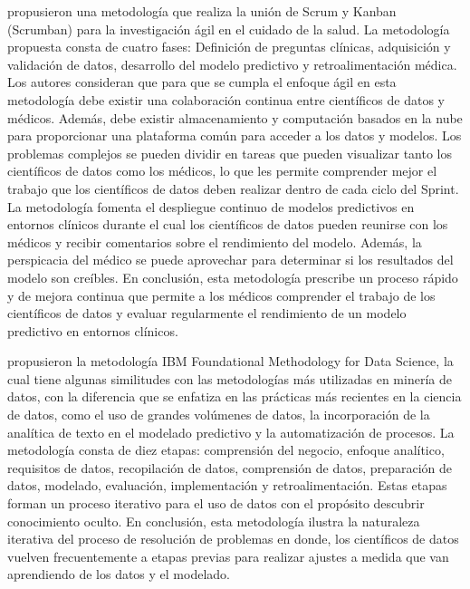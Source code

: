 \cite{Lei2020} propusieron una metodología que realiza la unión de Scrum y Kanban (Scrumban) para la investigación ágil en el cuidado de la salud. La metodología propuesta consta de cuatro fases: Definición de preguntas clínicas, adquisición y validación de datos, desarrollo del modelo predictivo y retroalimentación médica. Los autores consideran que para que se cumpla el enfoque ágil en esta metodología debe existir una colaboración continua entre científicos de datos y médicos. Además, debe existir almacenamiento y computación basados en la nube para proporcionar una plataforma común para acceder a los datos y modelos. Los problemas complejos se pueden dividir en tareas que pueden visualizar tanto los científicos de datos como los médicos, lo que les permite comprender mejor el trabajo que los científicos de datos deben realizar dentro de cada ciclo del Sprint. La metodología fomenta el despliegue continuo de modelos predictivos en entornos clínicos durante el cual los científicos de datos pueden reunirse con los médicos y recibir comentarios sobre el rendimiento del modelo. Además, la perspicacia del médico se puede aprovechar para determinar si los resultados del modelo son creíbles. En conclusión, esta metodología prescribe un proceso rápido y de mejora continua que permite a los médicos comprender el trabajo de los científicos de datos y evaluar regularmente el rendimiento de un modelo predictivo en entornos clínicos.

\cite{Rollins2015} propusieron la metodología IBM Foundational Methodology for Data Science, la cual tiene algunas similitudes con las metodologías más utilizadas en minería de datos, con la diferencia que se enfatiza en las prácticas más recientes en la ciencia de datos, como el uso de grandes volúmenes de datos, la incorporación de la analítica de texto en el modelado predictivo y la automatización de procesos. La metodología consta de diez etapas: comprensión del negocio, enfoque analítico, requisitos de datos, recopilación de datos, comprensión de datos, preparación de datos, modelado, evaluación, implementación y retroalimentación. Estas etapas forman un proceso iterativo para el uso de datos con el propósito descubrir conocimiento oculto. En conclusión, esta metodología ilustra la naturaleza iterativa del proceso de resolución de problemas en donde, los científicos de datos vuelven frecuentemente a etapas previas para realizar ajustes a medida que van aprendiendo de los datos y el modelado.  

